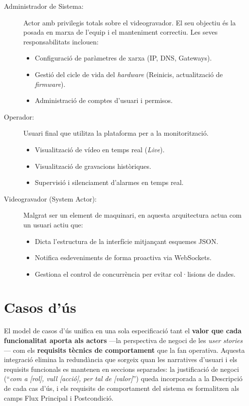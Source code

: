 \begin{description}
  \item[Administrador de Sistema:] Actor amb privilegis totals sobre el videogravador. El seu objectiu és la posada en marxa de l'equip i el manteniment correctiu. Les seves responsabilitats inclouen:
        \begin{itemize}
          \item Configuració de paràmetres de xarxa (IP, DNS, Gateways).
          \item Gestió del cicle de vida del \textit{hardware} (Reinicis, actualització de \textit{firmware}).
          \item Administració de comptes d'usuari i permisos.
        \end{itemize}

  \item[Operador:] Usuari final que utilitza la plataforma per a la monitorització.
        \begin{itemize}
          \item Visualització de vídeo en temps real (\textit{Live}).
          \item Visualització de gravacions històriques.
          \item Supervisió i silenciament d'alarmes en temps real.
        \end{itemize}

  \item[Videogravador (System Actor):] Malgrat ser un element de maquinari, en aquesta arquitectura actua com un usuari actiu que:
        \begin{itemize}
          \item Dicta l'estructura de la interfície mitjançant esquemes JSON.
          \item Notifica esdeveniments de forma proactiva via WebSockets.
          \item Gestiona el control de concurrència per evitar col·lisions de dades.
        \end{itemize}
\end{description}

\section{Casos d'ús}
\label{sec:casos_us}
El model de casos d'ús unifica en una sola especificació tant el \textbf{valor que cada funcionalitat aporta als actors} ---la perspectiva de negoci de les \textit{user stories}--- com els \textbf{requisits tècnics de comportament} que la fan operativa. Aquesta integració elimina la redundància que sorgeix quan les narratives d'usuari i els requisits funcionals es mantenen en seccions separades: la justificació de negoci (``\textit{com a [rol], vull [acció], per tal de [valor]}'') queda incorporada a la Descripció de cada cas d'ús, i els requisits de comportament del sistema es formalitzen als camps Flux Principal i Postcondició.

